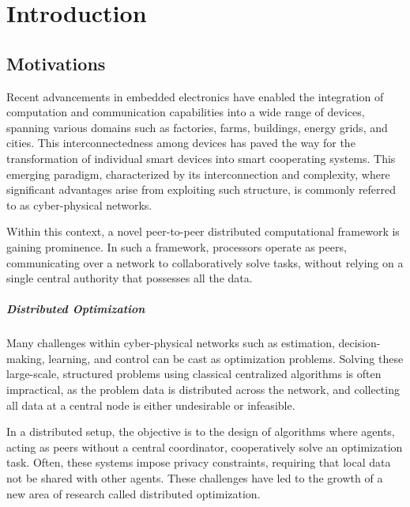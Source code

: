 \chapter*{Introduction}
\section*{Motivations} 
Recent advancements in embedded electronics have enabled the integration of computation and communication capabilities into a wide range of devices, spanning various domains such as factories, farms, buildings, energy grids, and cities. This interconnectedness among devices has paved the way for the transformation of individual smart devices into smart cooperating systems. This emerging paradigm, characterized by its interconnection and complexity, where significant advantages arise from exploiting such structure, is commonly referred to as cyber-physical networks.

Within this context, a novel peer-to-peer distributed computational framework is gaining prominence. In such a framework, processors operate as peers, communicating over a network to collaboratively solve tasks, without relying on a single central authority that possesses all the data. \cite{DistributedOptimizationSmartCyberPhysicalNetworks}

\paragraph{Distributed Optimization}
Many challenges within cyber-physical networks such as estimation, decision-making, learning, and control can be cast as optimization problems. Solving these large-scale, structured problems using classical centralized algorithms is often impractical, as the problem data is distributed across the network, and collecting all data at a central node is either undesirable or infeasible.

In a distributed setup, the objective is to the design of algorithms where agents, acting as peers without a central coordinator, cooperatively solve an optimization task.
Often, these systems impose privacy constraints, requiring that local data not be shared with other agents. These challenges have led to the growth of a new area of research called distributed optimization.

